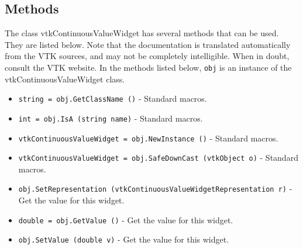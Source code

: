\subsection{Methods}

The class vtkContinuousValueWidget has several methods that can be used.
  They are listed below.
Note that the documentation is translated automatically from the VTK sources,
and may not be completely intelligible.  When in doubt, consult the VTK website.
In the methods listed below, \verb|obj| is an instance of the vtkContinuousValueWidget class.
\begin{itemize}
\item  \verb|string = obj.GetClassName ()| -  Standard macros.

\item  \verb|int = obj.IsA (string name)| -  Standard macros.

\item  \verb|vtkContinuousValueWidget = obj.NewInstance ()| -  Standard macros.

\item  \verb|vtkContinuousValueWidget = obj.SafeDownCast (vtkObject o)| -  Standard macros.

\item  \verb|obj.SetRepresentation (vtkContinuousValueWidgetRepresentation r)| -  Get the value for this widget. 

\item  \verb|double = obj.GetValue ()| -  Get the value for this widget. 

\item  \verb|obj.SetValue (double v)| -  Get the value for this widget. 

\end{itemize}
